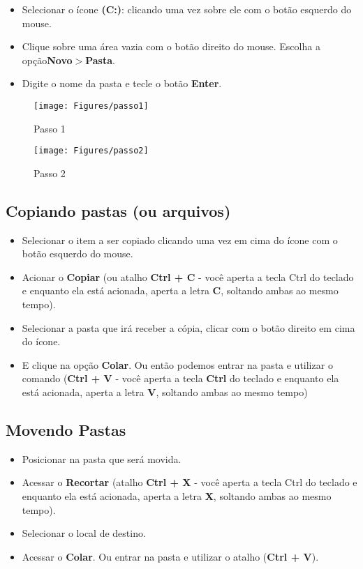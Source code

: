\documentclass[hidelinks,12pt]{article}
\begin{document}
		\begin{itemize}
			\item Selecionar o ícone {\bf(C:)}: clicando uma vez sobre ele com o botão esquerdo do mouse.
			\item Clique sobre uma área vazia com o botão direito do mouse. Escolha a opção{\bf Novo$>$Pasta}.
			\item Digite o nome da pasta e tecle o botão {\bf Enter}.
		\end{itemize}
		
		\begin{figure}[!h]
			\centering
			\texttt{[image: Figures/passo1]}
			\caption{Passo 1}
			\label{fig:passo1}
		\end{figure}
		
		
		\begin{figure}[!h]
			\centering
			\texttt{[image: Figures/passo2]}
			\caption{Passo 2}
			\label{fig:passo2}
		\end{figure}
		
		\newpage
		\subsection{Copiando pastas (ou arquivos)}
		
		\begin{itemize}
			
			\item Selecionar o item a ser copiado clicando uma vez em cima do ícone com o botão esquerdo do mouse.
			\item Acionar o {\bf Copiar} (ou atalho {\bf Ctrl + C} - você aperta a tecla Ctrl do teclado e enquanto ela está acionada, aperta a letra {\bf C}, soltando ambas ao mesmo tempo).
			\item Selecionar a pasta que irá receber a cópia, clicar com o botão direito em cima do ícone.
			\item E clique na opção {\bf Colar}. Ou então podemos entrar na pasta e utilizar o comando ({\bf Ctrl + V} - você aperta a tecla {\bf Ctrl} do teclado e enquanto ela está acionada, aperta a letra {\bf V}, soltando ambas ao mesmo tempo)
		\end{itemize}
		
		\subsection{Movendo Pastas}
		
		\begin{itemize}
			\item Posicionar na pasta que será movida.
			\item Acessar o {\bf Recortar} (atalho {\bf Ctrl + X} - você aperta a tecla Ctrl do teclado e enquanto ela está acionada, aperta a letra {\bf X}, soltando ambas ao mesmo tempo).
			\item Selecionar o local de destino.
			\item Acessar o {\bf Colar}. Ou entrar na pasta e utilizar o atalho ({\bf Ctrl + V}).
		\end{itemize}
		
\end{document}
